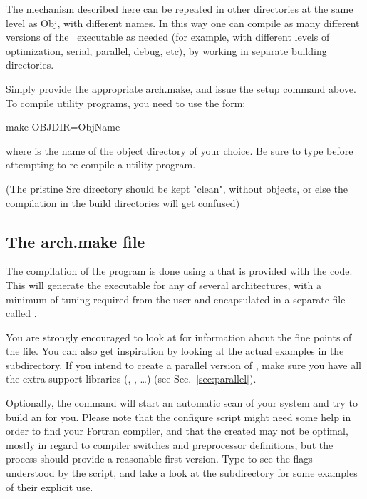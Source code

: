 The mechanism described here can be repeated in other directories at
the same level as Obj, with different names. In this way one can
compile as many different versions of the \siesta\ executable as
needed (for example, with different levels of optimization, serial,
parallel, debug, etc), by working in separate building directories.

Simply provide the appropriate arch.make, and issue the setup command
above. To compile utility programs, you need to use the form:
\begin{shellexample}
   make OBJDIR=ObjName
\end{shellexample}
where  is the name of the object directory of your
choice. Be sure to type  before attempting to
re-compile a utility program.

(The pristine Src directory should be kept "clean", without objects, or else
the compilation in the build directories will get confused)


\subsection{The arch.make file}
\label{sec:arch-make}

The compilation of the program is done using a  that is
provided with the code. This  will
generate the executable for any of several architectures, with a
minimum of tuning required from the user and encapsulated in a
separate file called .

You are strongly encouraged to look at
 for information about the
fine points of the  file. You can also get
inspiration by looking at the actual  examples in
the  subdirectory. If you intend to create a parallel
version of \siesta, make sure you have all the extra support libraries
(, , \dots) (see Sec.~\ref{sec:parallel}).
  
Optionally, the command  will start an
automatic scan of your system and try to build an 
for you. Please note that the configure script might need some help in
order to find your Fortran compiler, and that the created
 may not be optimal, mostly in regard to compiler
switches and preprocessor definitions, but the process should provide
a reasonable first version. Type  to
see the flags understood by the script, and take a look at the
 subdirectory for some examples of their explicit
use. 



